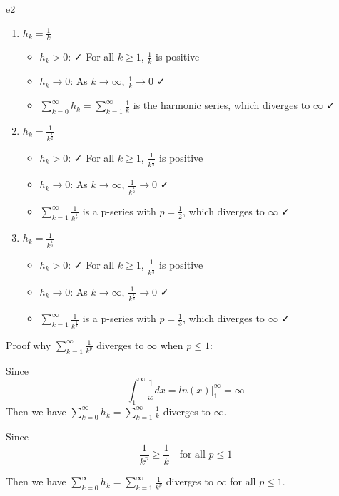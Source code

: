 \documentclass{article}
\begin{document}
\begin{SOLUTION}{e2}
\begin{enumerate}
	\item $h_k = \frac{1}{k}$
	\begin{itemize}
		\item $h_k > 0$: ✓ For all $k \geq 1$, $\frac{1}{k}$ is positive
		\item $h_k \to 0$: As $k \to \infty$, $\frac{1}{k} \to 0$ ✓
		\item $\sum_{k=0}^{\infty} h_k = \sum_{k=1}^{\infty} \frac{1}{k}$ is the harmonic series, which diverges to $\infty$ ✓
	\end{itemize}
	\item $h_k = \frac{1}{k^{\frac{1}{2}}}$
	\begin{itemize}
		\item $h_k > 0$: ✓ For all $k \geq 1$, $\frac{1}{k^{\frac{1}{2}}}$ is positive
		\item $h_k \to 0$: As $k \to \infty$, $\frac{1}{k^{\frac{1}{2}}} \to 0$ ✓
		\item $\sum_{k=1}^{\infty} \frac{1}{k^{\frac{1}{2}}}$ is a p-series with $p = \frac{1}{2}$, which diverges to $\infty$ ✓
	\end{itemize}
	\item $h_k = \frac{1}{k^{\frac{1}{3}}}$
	\begin{itemize}
		\item $h_k > 0$: ✓ For all $k \geq 1$, $\frac{1}{k^{\frac{1}{3}}}$ is positive
		\item $h_k \to 0$: As $k \to \infty$, $\frac{1}{k^{\frac{1}{3}}} \to 0$ ✓
		\item $\sum_{k=1}^{\infty} \frac{1}{k^{\frac{1}{3}}}$ is a p-series with $p = \frac{1}{3}$, which diverges to $\infty$ ✓
	\end{itemize}
\end{enumerate}
Proof why $\sum_{k=1}^{\infty} \frac{1}{k^p}$ diverges to $\infty$ when $p \leq 1$:

Since
\[
\int_1^{\infty} \frac{1}{x} dx = ln(x) |_1^{\infty} = \infty
\]
Then we have $\sum_{k=0}^{\infty} h_k = \sum_{k=1}^{\infty} \frac{1}{k}$ diverges to $\infty$.

Since 
\[
\frac{1}{k^p} \geq \frac{1}{k} \quad \text{for all } p \leq 1
\]

Then we have $\sum_{k=0}^{\infty} h_k = \sum_{k=1}^{\infty} \frac{1}{k^p}$ diverges to $\infty$ for all $p \leq 1$.

\end{SOLUTION}
\end{document}
